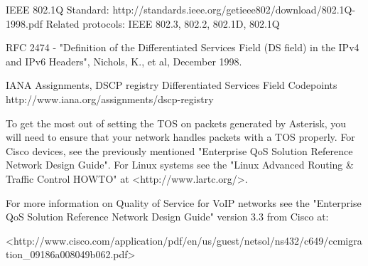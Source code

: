 IEEE 802.1Q Standard:
http://standards.ieee.org/getieee802/download/802.1Q-1998.pdf
Related protocols: IEEE 802.3, 802.2, 802.1D, 802.1Q

RFC 2474 - "Definition of the Differentiated Services Field
(DS field) in the IPv4 and IPv6 Headers", Nichols, K., et al,
December 1998.

IANA Assignments, DSCP registry
Differentiated Services Field Codepoints
http://www.iana.org/assignments/dscp-registry

To get the most out of setting the TOS on packets generated by
Asterisk, you will need to ensure that your network handles packets
with a TOS properly.  For Cisco devices, see the previously mentioned
"Enterprise QoS Solution Reference Network Design Guide".  For Linux
systems see the "Linux Advanced Routing \& Traffic Control HOWTO" at
<http://www.lartc.org/>.

For more information on Quality of
Service for VoIP networks see the "Enterprise QoS Solution Reference
Network Design Guide" version 3.3 from Cisco at:

<http://www.cisco.com/application/pdf/en/us/guest/netsol/ns432/c649/ccmigration\_09186a008049b062.pdf>

